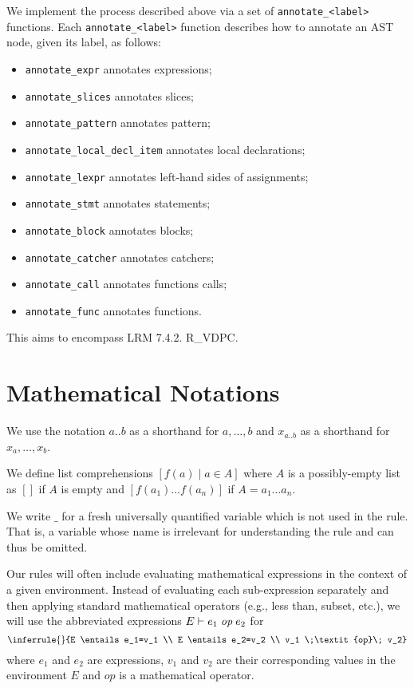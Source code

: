 \documentclass{book}
\newcommand\Ignore[0]{\texttt{\_}}
\begin{document}
We implement the process described above via a set of
\texttt{annotate\_<label>} functions. Each \texttt{annotate\_<label>}
function describes how to annotate an AST node, given its label, as follows:\begin{itemize}
\item \texttt{annotate\_expr} annotates expressions;
\item \texttt{annotate\_slices} annotates slices;
\item \texttt{annotate\_pattern} annotates pattern;
\item \texttt{annotate\_local\_decl\_item} annotates local declarations;
\item \texttt{annotate\_lexpr} annotates left-hand sides of assignments;
\item \texttt{annotate\_stmt} annotates statements;
\item \texttt{annotate\_block} annotates blocks;
\item \texttt{annotate\_catcher} annotates catchers;
\item \texttt{annotate\_call} annotates functions calls;
\item \texttt{annotate\_func} annotates functions.
\end{itemize}

This aims to encompass LRM 7.4.2. R\_VDPC.

\section{Mathematical Notations}

We use the notation $a..b$ as a shorthand for $a,\ldots,b$ and $x_{a..b}$ as a shorthand for $x_a,\ldots,x_b$.

We define list comprehensions $[f(a) \;|\; a \in A]$ where $A$ is a possibly-empty list as $[]$ if $A$ is empty and $[f(a_1) \ldots f(a_n)]$ if $A=a_1 \ldots a_n$.

We write $\Ignore$ for a fresh universally quantified variable which is not used in the rule. That is, a variable whose name is irrelevant for understanding the rule and can thus be omitted.

Our rules will often include evaluating mathematical expressions in the context of a given environment. Instead of evaluating each sub-expression separately and then applying standard mathematical operators (e.g., less than, subset, etc.), we will use the abbreviated expressions $E \vdash e_1 \;\textit{op}\; e_2$ for
\[
\inferrule{}{E \entails e_1=v_1 \\ E \entails e_2=v_2 \\ v_1 \;\textit{op}\; v_2}
\]
where $e_1$ and $e_2$ are expressions, $v_1$ and $v_2$ are their corresponding values in the environment $E$ and $\textit{op}$ is a mathematical operator.
\end{document}
